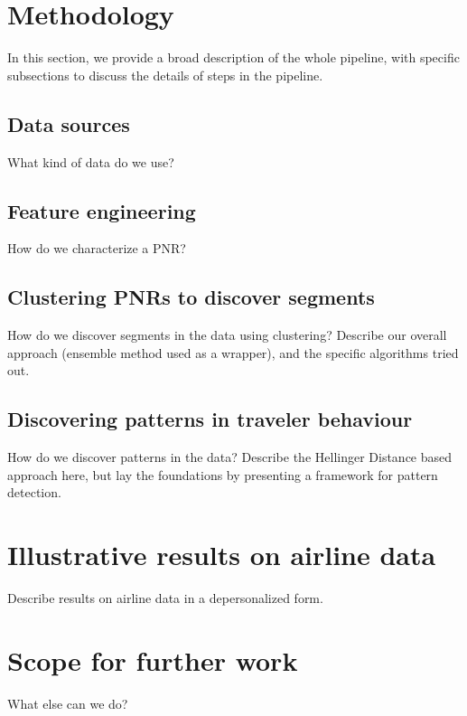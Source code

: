 \section{Methodology}
\label{sec:method}

In this section, we provide a broad description of the whole pipeline, with specific subsections to discuss the details of steps in the pipeline.

\subsection{Data sources}
\label{sec:data}

What kind of data do we use?

\subsection{Feature engineering}
\label{sec:features}

How do we characterize a PNR?

\subsection{Clustering PNRs to discover segments}
\label{sec:clusters}

How do we discover segments in the data using clustering? Describe our overall approach (ensemble method used as a wrapper), and the specific algorithms tried out.

\subsection{Discovering patterns in traveler behaviour}
\label{sec:patterns}

How do we discover patterns in the data? Describe the Hellinger Distance based approach here, but lay the foundations by presenting a framework for pattern detection.

\section{Illustrative results on airline data}
\label{sec:results}

Describe results on airline data in a depersonalized form.

\section{Scope for further work}
\label{sec:concl}

What else can we do?

  
  
  
  